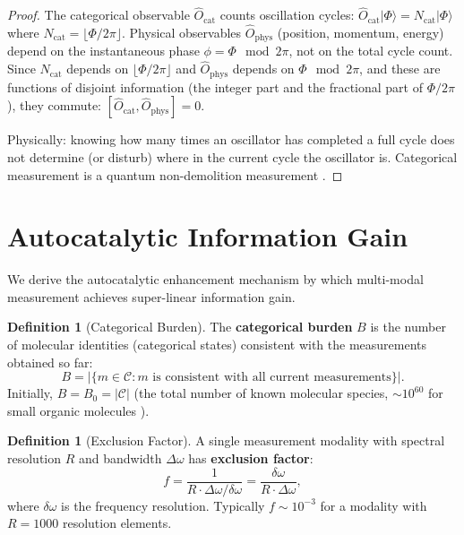 \documentclass[11pt,twocolumn,a4paper]{article}
\theoremstyle{definition}
\newtheorem{definition}[theorem]{Definition}
\theoremstyle{remark}
\newcommand{\Cat}{\mathcal{C}}
\newcommand{\Ocat}{\hat{O}_{\mathrm{cat}}}
\newcommand{\Ophys}{\hat{O}_{\mathrm{phys}}}
\begin{document}
\begin{proof}
The categorical observable $\Ocat$ counts oscillation cycles: $\Ocat |\Phi\rangle = N_{\mathrm{cat}} |\Phi\rangle$ where $N_{\mathrm{cat}} = \lfloor \Phi/2\pi \rfloor$. Physical observables $\Ophys$ (position, momentum, energy) depend on the instantaneous phase $\phi = \Phi \mod 2\pi$, not on the total cycle count. Since $N_{\mathrm{cat}}$ depends on $\lfloor \Phi/2\pi \rfloor$ and $\Ophys$ depends on $\Phi \mod 2\pi$, and these are functions of disjoint information (the integer part and the fractional part of $\Phi/2\pi$), they commute: $[\Ocat, \Ophys] = 0$.

Physically: knowing how many times an oscillator has completed a full cycle does not determine (or disturb) where in the current cycle the oscillator is. Categorical measurement is a quantum non-demolition measurement \citep{landauer1961}.
\end{proof}

\section{Autocatalytic Information Gain}
\label{sec:autocatalytic}

We derive the autocatalytic enhancement mechanism by which multi-modal measurement achieves super-linear information gain.

\begin{definition}[Categorical Burden]
\label{def:burden}
The \textbf{categorical burden} $B$ is the number of molecular identities (categorical states) consistent with the measurements obtained so far:
\begin{equation}
B = |\{m \in \Cat : m \text{ is consistent with all current measurements}\}|.
\end{equation}
Initially, $B = B_0 = |\Cat|$ (the total number of known molecular species, $\sim 10^{60}$ for small organic molecules \citep{kim2023}).
\end{definition}

\begin{definition}[Exclusion Factor]
\label{def:exclusion}
A single measurement modality with spectral resolution $R$ and bandwidth $\Delta\omega$ has \textbf{exclusion factor}:
\begin{equation}
f = \frac{1}{R \cdot \Delta\omega / \delta\omega} = \frac{\delta\omega}{R \cdot \Delta\omega},
\end{equation}
where $\delta\omega$ is the frequency resolution. Typically $f \sim 10^{-3}$ for a modality with $R = 1000$ resolution elements.
\end{definition}
\end{document}
